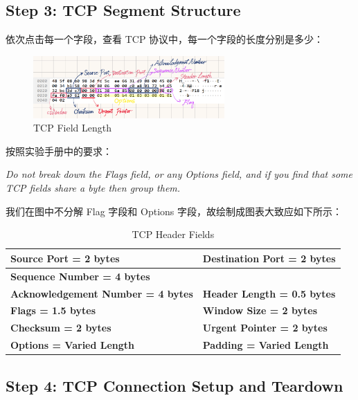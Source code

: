 \documentclass[14pt,a4paper,UTF8,twoside]{article}
\begin{document}
\subsection{Step 3: TCP Segment Structure}

依次点击每一个字段，查看 TCP 协议中，每一个字段的长度分别是多少：

\begin{figure}[H]
	\centering
	\includegraphics[width=0.65\textwidth]{lab6/field.png}
	\caption{TCP Field Length}
\end{figure}

按照实验手册中的要求：

\begin{mdframed}[backgroundcolor=gray!10, linewidth=0.5pt, roundcorner=5pt]
	\textit{Do not break down the Flags field, or any Options field, and if you find that some TCP fields share a byte then group them.}
\end{mdframed}

我们在图中不分解 Flag 字段和 Options 字段，故绘制成图表大致应如下所示：

\renewcommand{\arraystretch}{1.5} %
\begin{table}[H]
\centering
\begin{tabular}{|>{\centering\arraybackslash}p{6cm}|>{\centering\arraybackslash}p{6cm}|}
\hline
\textbf{Source Port = 2 bytes} & \textbf{Destination Port = 2 bytes} \\ \hline
\textbf{Sequence Number = 4 bytes} & \\ \hline
\textbf{Acknowledgement Number = 4 bytes} & \textbf{Header Length = 0.5 bytes} \\ \hline
\textbf{Flags = 1.5 bytes} & \textbf{Window Size = 2 bytes} \\ \hline
\textbf{Checksum = 2 bytes} & \textbf{Urgent Pointer = 2 bytes} \\ \hline
\textbf{Options = Varied Length} & \textbf{Padding = Varied Length} \\ \hline
\end{tabular}
\caption{TCP Header Fields}
\end{table}

\subsection{Step 4: TCP Connection Setup and Teardown}
\end{document}
